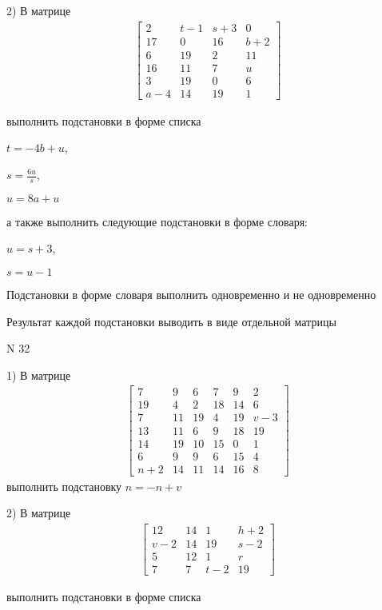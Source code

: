 \documentclass[11pt]{report}
\begin{document}
    2) В матрице
\begin{align*}
\left[\begin{matrix}2 & t - 1 & s + 3 & 0\\17 & 0 & 16 & b + 2\\6 & 19 & 2 & 11\\16 & 11 & 7 & u\\3 & 19 & 0 & 6\\a - 4 & 14 & 19 & 1\end{matrix}\right]
\end{align*}

выполнить подстановки в форме списка

$t=- 4 b + u$,

$s=\frac{6 u}{s}$,

$u=8 a + u$

а также выполнить следующие подстановки в форме словаря:

$u=s + 3$,

$s=u - 1$


    Подстановки в форме словаря выполнить одновременно и не одновременно


    Результат каждой подстановки выводить в виде отдельной матрицы

\newpage
N 32


    1) В матрице
\begin{align*}
\left[\begin{matrix}7 & 9 & 6 & 7 & 9 & 2\\19 & 4 & 2 & 18 & 14 & 6\\7 & 11 & 19 & 4 & 19 & v - 3\\13 & 11 & 6 & 9 & 18 & 19\\14 & 19 & 10 & 15 & 0 & 1\\6 & 9 & 9 & 6 & 15 & 4\\n + 2 & 14 & 11 & 14 & 16 & 8\end{matrix}\right]
\end{align*}
выполнить подстановку $n=- n + v$


    2) В матрице
\begin{align*}
\left[\begin{matrix}12 & 14 & 1 & h + 2\\v - 2 & 14 & 19 & s - 2\\5 & 12 & 1 & r\\7 & 7 & t - 2 & 19\end{matrix}\right]
\end{align*}

выполнить подстановки в форме списка
\end{document}
